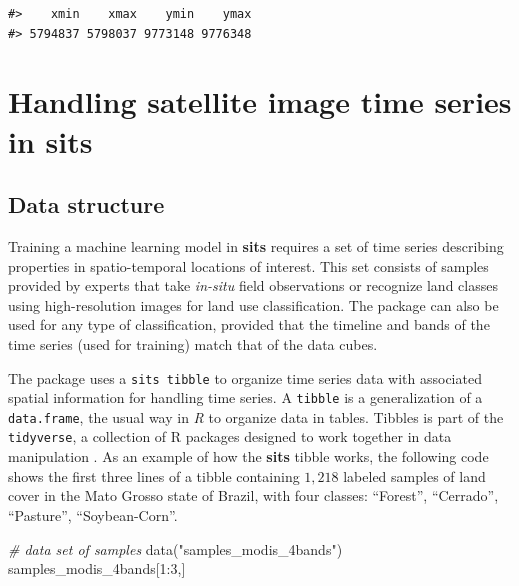 \documentclass[a4paper,]{tufte-book}
\newenvironment{Shaded}{}{}
\newcommand{\CommentTok}[1]{\textcolor[rgb]{0.38,0.63,0.69}{\textit{#1}}}
\newcommand{\DecValTok}[1]{\textcolor[rgb]{0.25,0.63,0.44}{#1}}
\newcommand{\FunctionTok}[1]{\textcolor[rgb]{0.02,0.16,0.49}{#1}}
\newcommand{\NormalTok}[1]{#1}
\newcommand{\SpecialCharTok}[1]{\textcolor[rgb]{0.25,0.44,0.63}{#1}}
\newcommand{\StringTok}[1]{\textcolor[rgb]{0.25,0.44,0.63}{#1}}
\begin{document}
\begin{verbatim}
#>    xmin    xmax    ymin    ymax 
#> 5794837 5798037 9773148 9776348
\end{verbatim}

\hypertarget{handling-satellite-image-time-series-in-sits}{%
\section{\texorpdfstring{Handling satellite image time series in \textbf{sits}}{Handling satellite image time series in sits}}\label{handling-satellite-image-time-series-in-sits}}

\hypertarget{data-structure}{%
\subsection{Data structure}\label{data-structure}}

Training a machine learning model in \textbf{sits} requires a set of time series describing properties in spatio-temporal locations of interest. This set consists of samples provided by experts that take \emph{in-situ} field observations or recognize land classes using high-resolution images for land use classification. The package can also be used for any type of classification, provided that the timeline and bands of the time series (used for training) match that of the data cubes.

The package uses a \texttt{sits\ tibble} to organize time series data with associated spatial information for handling time series. A \texttt{tibble} is a generalization of a \texttt{data.frame}, the usual way in \emph{R} to organize data in tables. Tibbles is part of the \texttt{tidyverse}, a collection of R packages designed to work together in data manipulation \citep{Wickham2017}. As an example of how the \textbf{sits} tibble works, the following code shows the first three lines of a tibble containing \(1,218\) labeled samples of land cover in the Mato Grosso state of Brazil, with four classes: ``Forest'', ``Cerrado'', ``Pasture'', ``Soybean-Corn''.

\begin{Shaded}
\begin{Highlighting}[]
\CommentTok{\# data set of samples}
\FunctionTok{data}\NormalTok{(}\StringTok{"samples\_modis\_4bands"}\NormalTok{)}
\NormalTok{samples\_modis\_4bands[}\DecValTok{1}\SpecialCharTok{:}\DecValTok{3}\NormalTok{,]}
\end{Highlighting}
\end{Shaded}
\end{document}
